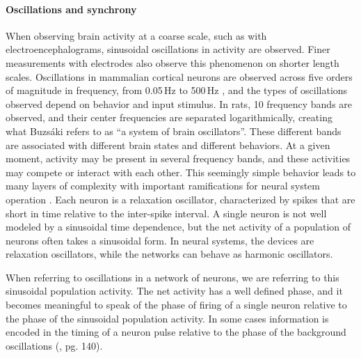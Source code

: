 \documentclass[twocolumn]{article}
\begin{document}
\paragraph{\label{sec:oscillations_and_synchrony}Oscillations and synchrony}
When observing brain activity at a coarse scale, such as with electroencephalograms, sinusoidal oscillations in activity are observed. Finer measurements with electrodes also observe this phenomenon on shorter length scales. Oscillations in mammalian cortical neurons are observed across five orders of magnitude in frequency, from 0.05\,Hz to 500\,Hz \cite{budr2004}, and the types of oscillations observed depend on behavior and input stimulus. In rats, 10 frequency bands are observed, and their center frequencies are separated logarithmically, creating what Buzs\'{a}ki refers to as ``a system of brain oscillators''. These different bands are associated with different brain states and different behaviors. At a given moment, activity may be present in several frequency bands, and these activities may compete or interact with each other.   This seemingly simple behavior leads to many layers of complexity with important ramifications for neural system operation \cite{bu2006}. Each neuron is a relaxation oscillator, characterized by spikes that are short in time relative to the inter-spike interval. A single neuron is not well modeled by a sinusoidal time dependence, but the net activity of a population of neurons often takes a sinusoidal form. In neural systems, the devices are relaxation oscillators, while the networks can behave as harmonic oscillators. 

When referring to oscillations in a network of neurons, we are referring to this sinusoidal population activity. The net activity has a well defined phase, and it becomes meaningful to speak of the phase of firing of a single neuron relative to the phase of the sinusoidal population activity. In some cases information is encoded in the timing of a neuron pulse relative to the phase of the background oscillations (\cite{geki2002}, pg. 140).
\end{document}
